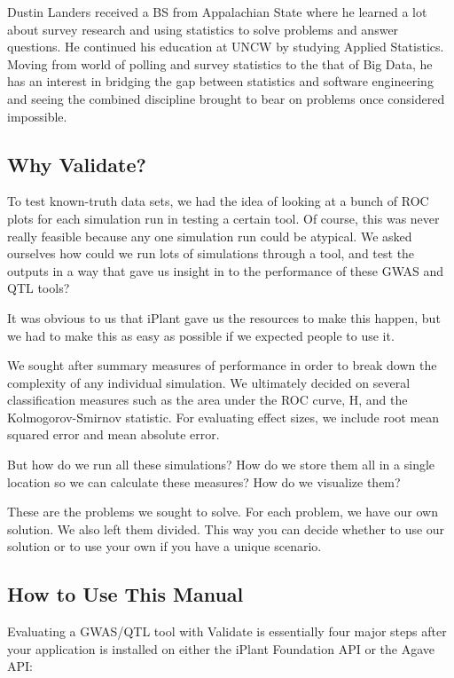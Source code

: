 \documentclass[twoside,a4paper]{refart}
\begin{document}
Dustin Landers received a BS from Appalachian State where he learned a lot about survey research and using statistics to solve problems and answer questions. He continued his education at UNCW by studying Applied Statistics. Moving from world of polling and survey statistics to the that of Big Data, he has an interest in bridging the gap between statistics and software engineering and seeing the combined discipline brought to bear on problems once considered impossible.


\subsection{Why Validate?}

To test known-truth data sets, we had the idea of looking at a bunch of ROC plots for each simulation run in testing a certain tool. Of course, this was never really feasible because any one simulation run could be atypical. We asked ourselves how could we run lots of simulations through a tool, and test the outputs in a way that gave us insight in to the performance of these GWAS and QTL tools?

It was obvious to us that iPlant gave us the resources to make this happen, but we had to make this as easy as possible if we expected people to use it. 

We sought after summary measures of performance in order to break down the complexity of any individual simulation. We ultimately decided on several classification measures such as the area under the ROC curve, H, and the Kolmogorov-Smirnov statistic. For evaluating effect sizes, we include root mean squared error and mean absolute error. 

But how do we run all these simulations? How do we store them all in a single location so we can calculate these measures? How do we visualize them?

These are the problems we sought to solve. For each problem, we have our own solution. We also left them divided. This way you can decide whether to use our solution or to use your own if you have a unique scenario.

\subsection{How to Use This Manual}

Evaluating a GWAS/QTL tool with Validate is essentially four major steps after your application is installed on either the iPlant Foundation API or the Agave API:
\end{document}
